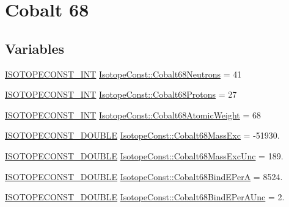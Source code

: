 \hypertarget{group___isotope_const-_cobalt-_co68}{}\section{Cobalt 68}
\label{group___isotope_const-_cobalt-_co68}
\subsection*{Variables}
\begin{DoxyCompactItemize}
\item 
\mbox{\hyperlink{group___isotope_const-_macros_ga5f18360b3e99483a35c32d789e62621c}{I\+S\+O\+T\+O\+P\+E\+C\+O\+N\+S\+T\+\_\+\+I\+NT}} \mbox{\hyperlink{group___isotope_const-_cobalt-_co68_gaf423cdd4d5efb6324f60f79f2ce1858e}{Isotope\+Const\+::\+Cobalt68\+Neutrons}} = 41
\item 
\mbox{\hyperlink{group___isotope_const-_macros_ga5f18360b3e99483a35c32d789e62621c}{I\+S\+O\+T\+O\+P\+E\+C\+O\+N\+S\+T\+\_\+\+I\+NT}} \mbox{\hyperlink{group___isotope_const-_cobalt-_co68_ga51f6ebc99e6789af537eba710201b7fd}{Isotope\+Const\+::\+Cobalt68\+Protons}} = 27
\item 
\mbox{\hyperlink{group___isotope_const-_macros_ga5f18360b3e99483a35c32d789e62621c}{I\+S\+O\+T\+O\+P\+E\+C\+O\+N\+S\+T\+\_\+\+I\+NT}} \mbox{\hyperlink{group___isotope_const-_cobalt-_co68_ga0084054260e533925f6d43c7c1bdac03}{Isotope\+Const\+::\+Cobalt68\+Atomic\+Weight}} = 68
\item 
\mbox{\hyperlink{group___isotope_const-_macros_ga8f45a7272ce02c0b4c65c44636ed719a}{I\+S\+O\+T\+O\+P\+E\+C\+O\+N\+S\+T\+\_\+\+D\+O\+U\+B\+LE}} \mbox{\hyperlink{group___isotope_const-_cobalt-_co68_ga75aa131d298075dddc71821de2e3a1d6}{Isotope\+Const\+::\+Cobalt68\+Mass\+Exc}} = -\/51930.
\item 
\mbox{\hyperlink{group___isotope_const-_macros_ga8f45a7272ce02c0b4c65c44636ed719a}{I\+S\+O\+T\+O\+P\+E\+C\+O\+N\+S\+T\+\_\+\+D\+O\+U\+B\+LE}} \mbox{\hyperlink{group___isotope_const-_cobalt-_co68_gafa364f72980f957d73d17931ca70ba48}{Isotope\+Const\+::\+Cobalt68\+Mass\+Exc\+Unc}} = 189.
\item 
\mbox{\hyperlink{group___isotope_const-_macros_ga8f45a7272ce02c0b4c65c44636ed719a}{I\+S\+O\+T\+O\+P\+E\+C\+O\+N\+S\+T\+\_\+\+D\+O\+U\+B\+LE}} \mbox{\hyperlink{group___isotope_const-_cobalt-_co68_gaf442b3a0870e26997ffc999ce08f2416}{Isotope\+Const\+::\+Cobalt68\+Bind\+E\+PerA}} = 8524.
\item 
\mbox{\hyperlink{group___isotope_const-_macros_ga8f45a7272ce02c0b4c65c44636ed719a}{I\+S\+O\+T\+O\+P\+E\+C\+O\+N\+S\+T\+\_\+\+D\+O\+U\+B\+LE}} \mbox{\hyperlink{group___isotope_const-_cobalt-_co68_ga1ab2dc6caa7b76b76a9dbd4c5d78ebc4}{Isotope\+Const\+::\+Cobalt68\+Bind\+E\+Per\+A\+Unc}} = 2.

\end{DoxyCompactItemize}

